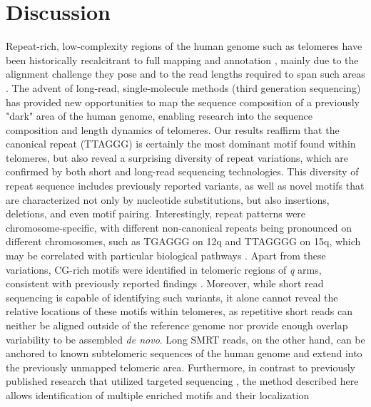 \documentclass{article}
\begin{document}
\section*{Discussion}  \label{sec:discussion}
    Repeat-rich, low-complexity regions of the human genome such as telomeres
        have been historically recalcitrant to full mapping and annotation \parencite{miga2015},
        mainly due to the alignment challenge they pose and to the read lengths required to span such areas \parencite{ngslowcomplexity}.
    The advent of long-read, single-molecule methods (third generation sequencing)
        has provided new opportunities to map the sequence composition of a previously "dark" area of the human genome,
        enabling research into the sequence composition and length dynamics \parencite{luxton2020} of telomeres.
    Our results reaffirm
        that the canonical repeat (TTAGGG) is certainly the most dominant motif found within telomeres,
        but also reveal a surprising diversity of repeat variations,
            which are confirmed by both short and long-read sequencing technologies.
    This diversity of repeat sequence includes previously reported variants,
        as well as novel motifs that are characterized not only by nucleotide substitutions,
        but also insertions, deletions, and even motif pairing.
    Interestingly, repeat patterns were chromosome-specific, with different non-canonical repeats being pronounced on different chromosomes,
        such as TGAGGG on 12q and TTAGGGG on 15q, which may be correlated with particular biological pathways \parencite{telovars2019}.
    Apart from these variations,
        CG-rich motifs were identified in telomeric regions of \textit{q} arms,
        consistent with previously reported findings \parencite{cpg}.
    Moreover, while short read sequencing is capable of identifying such variants,
        it alone cannot reveal the relative locations of these motifs within telomeres,
        as repetitive short reads can
            neither be aligned outside of the reference genome
            nor provide enough overlap variability to be assembled \textit{de novo}.
    Long SMRT reads, on the other hand,
        can be anchored to known subtelomeric sequences of the human genome and extend into the previously unmapped telomeric area.
    Furthermore, in contrast to previously published research that utilized targeted sequencing
        \parencite{telovars1989,telovars1999,telovars2018,telovars2019},
        the method described here allows identification of multiple enriched motifs and their localization
\end{document}
